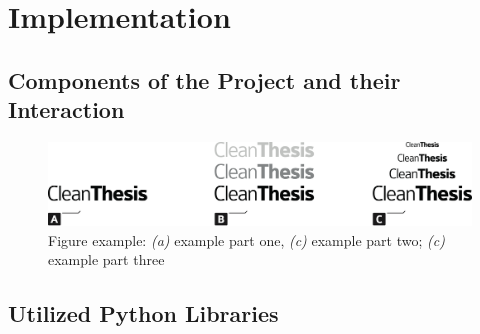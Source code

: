 %
\chapter{Implementation}
\label{sec:implementation}

\Blindtext

\section{Components of the Project and their Interaction}
\label{sec:implementation:components}

\Blindtext

\begin{figure}[htb]
	\includegraphics[width=\textwidth]{gfx/Clean-Thesis-Figure}
	\caption{Figure example: \textit{(a)} example part one, \textit{(c)} example part two; \textit{(c)} example part three}
	\label{fig:implementation:example1}
\end{figure}

\Blindtext

\section{Utilized Python Libraries}
\label{sec:implementation:libraries}

\Blindtext

